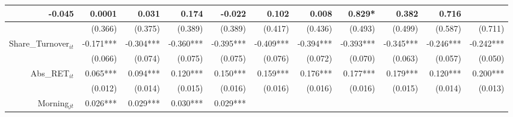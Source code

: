 \begin{table}
{\begin{tabular}{rrrrrrrrrrr}
  \multicolumn{1}{r|}{-0.045} &
  \multicolumn{1}{r|}{0.0001} &
  \multicolumn{1}{r|}{0.031} &
  \multicolumn{1}{r|}{0.174} &
  \multicolumn{1}{r|}{-0.022} &
  \multicolumn{1}{r|}{0.102} &
  \multicolumn{1}{r|}{0.008} &
  \multicolumn{1}{r|}{0.829*} &
  \multicolumn{1}{r|}{0.382} &
  \multicolumn{1}{r|}{0.716} \\ \hline
\multicolumn{1}{|r|}{} &
  \multicolumn{1}{r|}{(0.366)} &
  \multicolumn{1}{r|}{(0.375)} &
  \multicolumn{1}{r|}{(0.389)} &
  \multicolumn{1}{r|}{(0.389)} &
  \multicolumn{1}{r|}{(0.417)} &
  \multicolumn{1}{r|}{(0.436)} &
  \multicolumn{1}{r|}{(0.493)} &
  \multicolumn{1}{r|}{(0.499)} &
  \multicolumn{1}{r|}{(0.587)} &
  \multicolumn{1}{r|}{(0.711)} \\ \hline
\multicolumn{1}{|r|}{Share\_Turnover$_{it}$} &
  \multicolumn{1}{r|}{-0.171***} &
  \multicolumn{1}{r|}{-0.304***} &
  \multicolumn{1}{r|}{-0.360***} &
  \multicolumn{1}{r|}{-0.395***} &
  \multicolumn{1}{r|}{-0.409***} &
  \multicolumn{1}{r|}{-0.394***} &
  \multicolumn{1}{r|}{-0.393***} &
  \multicolumn{1}{r|}{-0.345***} &
  \multicolumn{1}{r|}{-0.246***} &
  \multicolumn{1}{r|}{-0.242***} \\ \hline
\multicolumn{1}{|r|}{} &
  \multicolumn{1}{r|}{(0.066)} &
  \multicolumn{1}{r|}{(0.074)} &
  \multicolumn{1}{r|}{(0.075)} &
  \multicolumn{1}{r|}{(0.075)} &
  \multicolumn{1}{r|}{(0.076)} &
  \multicolumn{1}{r|}{(0.072)} &
  \multicolumn{1}{r|}{(0.070)} &
  \multicolumn{1}{r|}{(0.063)} &
  \multicolumn{1}{r|}{(0.057)} &
  \multicolumn{1}{r|}{(0.050)} \\ \hline
\multicolumn{1}{|r|}{Abs\_RET$_{it}$} &
  \multicolumn{1}{r|}{0.065***} &
  \multicolumn{1}{r|}{0.094***} &
  \multicolumn{1}{r|}{0.120***} &
  \multicolumn{1}{r|}{0.150***} &
  \multicolumn{1}{r|}{0.159***} &
  \multicolumn{1}{r|}{0.176***} &
  \multicolumn{1}{r|}{0.177***} &
  \multicolumn{1}{r|}{0.179***} &
  \multicolumn{1}{r|}{0.120***} &
  \multicolumn{1}{r|}{0.200***} \\ \hline
\multicolumn{1}{|r|}{} &
  \multicolumn{1}{r|}{(0.012)} &
  \multicolumn{1}{r|}{(0.014)} &
  \multicolumn{1}{r|}{(0.015)} &
  \multicolumn{1}{r|}{(0.016)} &
  \multicolumn{1}{r|}{(0.016)} &
  \multicolumn{1}{r|}{(0.016)} &
  \multicolumn{1}{r|}{(0.016)} &
  \multicolumn{1}{r|}{(0.015)} &
  \multicolumn{1}{r|}{(0.014)} &
  \multicolumn{1}{r|}{(0.013)} \\ \hline
\multicolumn{1}{|r|}{Morning$_{jt}$} &
  \multicolumn{1}{r|}{0.026***} &
  \multicolumn{1}{r|}{0.029***} &
  \multicolumn{1}{r|}{0.030***} &
  \multicolumn{1}{r|}{0.029***} &

\end{tabular}}
\end{table}
